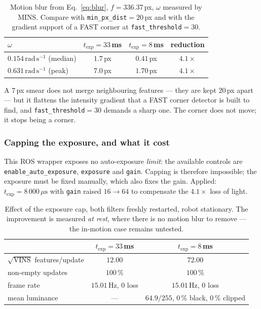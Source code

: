 \begin{table}[htbp]
\centering
\caption{Motion blur from Eq.~\eqref{eq:blur}, $f=336.37$\,px, $\omega$
measured by MINS. Compare with \texttt{min\_px\_dist}$=20$\,px and with the
gradient support of a FAST corner at \texttt{fast\_threshold}$=30$.}
\label{tab:blur}
\begin{tabular}{lccc}
\hline
$\omega$ & $t_{\mathrm{exp}}=33$\,ms & $t_{\mathrm{exp}}=8$\,ms & reduction \\
\hline
$0.154\,\mathrm{rad\,s^{-1}}$ (median) & $1.7$\,px & $0.41$\,px & $4.1\times$ \\
$0.631\,\mathrm{rad\,s^{-1}}$ (peak)   & $7.0$\,px & $1.70$\,px & $4.1\times$ \\
\hline
\end{tabular}
\end{table}

A $7$\,px smear does not merge neighbouring features --- they are kept
$20$\,px apart --- but it flattens the intensity gradient that a FAST corner
detector is built to find, and \texttt{fast\_threshold}$=30$ demands a sharp
one. The corner does not move; it stops being a corner.

\subsubsection{Capping the exposure, and what it cost}

This ROS wrapper exposes no auto-exposure \emph{limit}: the available controls
are \texttt{enable\_auto\_exposure}, \texttt{exposure} and \texttt{gain}.
Capping is therefore impossible; the exposure must be fixed manually, which
also fixes the gain. Applied: $t_{\mathrm{exp}}=8\,000\,\mu\mathrm{s}$ with
\texttt{gain} raised $16\rightarrow64$ to compensate the $4.1\times$ loss of
light.

\begin{table}[htbp]
\centering
\caption{Effect of the exposure cap, both filters freshly restarted, robot
stationary. The improvement is measured \emph{at rest}, where there is no
motion blur to remove --- the in-motion case remains untested.}
\label{tab:expcap}
\begin{tabular}{lcc}
\hline
 & $t_{\mathrm{exp}}=33$\,ms & $t_{\mathrm{exp}}=8$\,ms \\
\hline
$\sqrt{\text{VINS}}$ features/update & $12.00$ & $\mathbf{72.00}$ \\
non-empty updates & $100\,\%$ & $100\,\%$ \\
frame rate & $15.01$\,Hz, 0 loss & $15.01$\,Hz, 0 loss \\
mean luminance & --- & $64.9/255$, $0\,\%$ black, $0\,\%$ clipped \\
\hline
\end{tabular}
\end{table}

